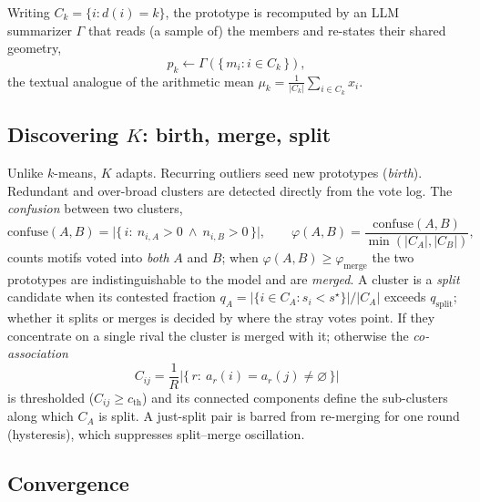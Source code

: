 Writing $C_k=\{i:d(i)=k\}$, the prototype is recomputed by an LLM summarizer
$\Gamma$ that reads (a sample of) the members and re-states their shared geometry,
\begin{equation}
p_k \leftarrow \Gamma\!\left(\{\,m_i : i\in C_k\,\}\right),
\label{eq:update}
\end{equation}
the textual analogue of the arithmetic mean $\mu_k=\frac{1}{|C_k|}\sum_{i\in
C_k}x_i$.

\subsection{Discovering $K$: birth, merge, split}

Unlike $k$-means, $K$ adapts. Recurring outliers seed new prototypes
(\emph{birth}). Redundant and over-broad clusters are detected directly from the
vote log. The \emph{confusion} between two clusters,
\begin{equation}
\mathrm{confuse}(A,B)=\bigl|\{\,i:\ n_{i,A}>0 \ \wedge\ n_{i,B}>0\,\}\bigr|,
\qquad
\varphi(A,B)=\frac{\mathrm{confuse}(A,B)}{\min(|C_A|,|C_B|)},
\label{eq:phi}
\end{equation}
counts motifs voted into \emph{both} $A$ and $B$; when $\varphi(A,B)\ge
\varphi_{\mathrm{merge}}$ the two prototypes are indistinguishable to the model
and are \emph{merged}. A cluster is a \emph{split} candidate when its contested
fraction $q_A=|\{i\in C_A:s_i<s^\star\}|/|C_A|$ exceeds $q_{\mathrm{split}}$;
whether it splits or merges is decided by where the stray votes point. If they
concentrate on a single rival the cluster is merged with it; otherwise the
\emph{co-association}
\begin{equation}
C_{ij}=\frac{1}{R}\bigl|\{\,r:\ a_r(i)=a_r(j)\ne\varnothing\,\}\bigr|
\label{eq:coassoc}
\end{equation}
is thresholded ($C_{ij}\ge c_{\mathrm{th}}$) and its connected components define
the sub-clusters along which $C_A$ is split. A just-split pair is barred from
re-merging for one round (hysteresis), which suppresses split--merge oscillation.

\subsection{Convergence}

